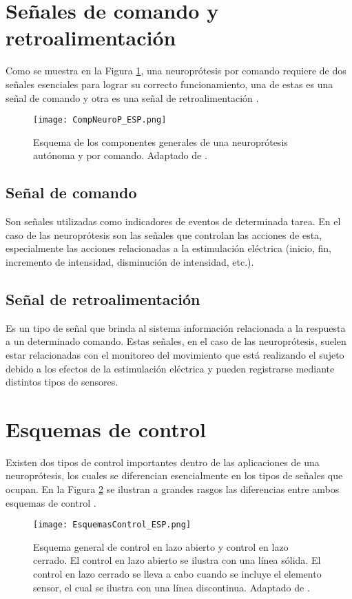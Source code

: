 \section{Señales de comando y retroalimentación}
Como se muestra en la Figura \ref{Figura: CompNeuroP}, una neuroprótesis por comando requiere de dos señales esenciales para lograr su correcto funcionamiento, una de estas es una señal de comando y otra es una señal de retroalimentación \cite{Popovic2015}.

\begin{figure}[htbp]
\centering
	\texttt{[image: CompNeuroP\_ESP.png]}
	\caption{Esquema de los componentes generales de una neuroprótesis autónoma y por comando. Adaptado de \cite{Popovic2015}.}
	\label{Figura: CompNeuroP}
\end{figure}

\subsection{Señal de comando}
Son señales utilizadas como indicadores de eventos de determinada tarea. En el caso de las neuroprótesis son las señales que controlan las acciones de esta, especialmente las acciones relacionadas a la estimulación eléctrica (inicio, fin, incremento de intensidad, disminución de intensidad, etc.).

\subsection{Señal de retroalimentación}
Es un tipo de señal que brinda al sistema información relacionada a la respuesta a un determinado comando. Estas señales, en el caso de las neuroprótesis, suelen estar relacionadas con el monitoreo del movimiento que está realizando el sujeto debido a los efectos de la estimulación eléctrica y pueden registrarse mediante distintos tipos de sensores.

\section{Esquemas de control}
Existen dos tipos de control importantes dentro de las aplicaciones de una neuroprótesis, los cuales se diferencian esencialmente en los tipos de señales que ocupan. En la Figura \ref{Figura: EsqCont} se ilustran a grandes rasgos las diferencias entre ambos esquemas de control \cite{Wright2016}.

\begin{figure}[htbp]
\centering
	\texttt{[image: EsquemasControl\_ESP.png]}
	\caption{Esquema general de control en lazo abierto y control en lazo cerrado. El control en lazo abierto se ilustra con una línea sólida. El control en lazo cerrado se lleva a cabo cuando se incluye el elemento sensor, el cual se ilustra con una línea discontinua. Adaptado de \cite{Wright2016}.}
	\label{Figura: EsqCont}
\end{figure}

